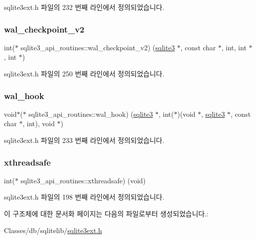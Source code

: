 sqlite3ext.\+h 파일의 232 번째 라인에서 정의되었습니다.

\mbox{\label{structsqlite3__api__routines_a86ce375053098d8fbb2d686e9d98d12e}} 
\subsubsection{\texorpdfstring{wal\+\_\+checkpoint\+\_\+v2}{wal\_checkpoint\_v2}}
{\footnotesize\ttfamily int($\ast$ sqlite3\+\_\+api\+\_\+routines\+::wal\+\_\+checkpoint\+\_\+v2) (\hyperlink{sqlite3_8h_a0ef6f2646262c8a9b24368d8ac140f69}{sqlite3} $\ast$, const char $\ast$, int, int $\ast$, int $\ast$)}



sqlite3ext.\+h 파일의 250 번째 라인에서 정의되었습니다.

\mbox{\label{structsqlite3__api__routines_ab2ee32e155fc08dc01f10e11fcd31d00}} 
\subsubsection{\texorpdfstring{wal\+\_\+hook}{wal\_hook}}
{\footnotesize\ttfamily void$\ast$($\ast$ sqlite3\+\_\+api\+\_\+routines\+::wal\+\_\+hook) (\hyperlink{sqlite3_8h_a0ef6f2646262c8a9b24368d8ac140f69}{sqlite3} $\ast$, int($\ast$)(void $\ast$, \hyperlink{sqlite3_8h_a0ef6f2646262c8a9b24368d8ac140f69}{sqlite3} $\ast$, const char $\ast$, int), void $\ast$)}



sqlite3ext.\+h 파일의 233 번째 라인에서 정의되었습니다.

\mbox{\label{structsqlite3__api__routines_a965bd76d061a5f47729a6c96faac3aa2}} 
\subsubsection{\texorpdfstring{xthreadsafe}{xthreadsafe}}
{\footnotesize\ttfamily int($\ast$ sqlite3\+\_\+api\+\_\+routines\+::xthreadsafe) (void)}



sqlite3ext.\+h 파일의 198 번째 라인에서 정의되었습니다.



이 구조체에 대한 문서화 페이지는 다음의 파일로부터 생성되었습니다.\+:\begin{DoxyCompactItemize}
\item 
Classes/db/sqlitelib/\hyperlink{sqlite3ext_8h}{sqlite3ext.\+h}\end{DoxyCompactItemize}
